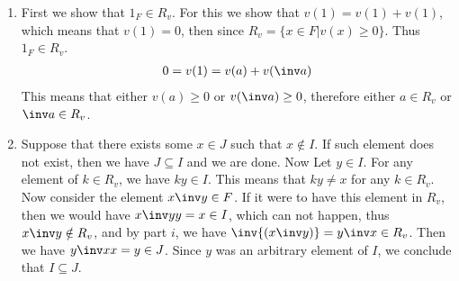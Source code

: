 \begin{enumerate}[label=\ilabel]
    \item 
        First we show that $1_F \in R_v$. For this we show that $v(1) = v(1) + v(1)$, which means that $v(1) = 0$, then since $R_v = \{x \in F | v(x) \ge 0 \}$. Thus $1_F \in R_v$. 
        \begin{gather*}
            0 = v(1) = v(a) + v(\inv a)
        \end{gather*} 
        This means that either $v(a) \ge 0$ or $v(\inv a) \ge 0$, therefore either $a \in R_v$ or $\inv a \in R_v$.
    \item 
        Suppose that there exists some $x \in J$ such that $x \notin I$. If such element does not exist, then we have $J \subseteq I$ and we are done.
        Now Let $y \in I$. For any element of $k \in R_v$, we have $ky \in I$. This means that $ky \ne x$ for any $k \in R_v$. Now consider the element $x \inv y \in F$. If it were to have this element in $R_v$, then we would have $x \inv y y = x \in I$, which can not happen, thus $x \inv y \notin R_v$, and by part $i$, we have $\inv{(x \inv y)} = y \inv x \in R_v$. Then we have $y \inv x x = y \in J$. Since $y$ was an arbitrary element of $I$, we conclude that $I \subseteq J$.


\end{enumerate}

